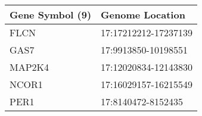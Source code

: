 \begin{tabular}{ll}
\toprule
Gene Symbol (9) &      Genome Location \\
\midrule
           FLCN & 17:17212212-17237139 \\
           GAS7 &  17:9913850-10198551 \\
         MAP2K4 & 17:12020834-12143830 \\
          NCOR1 & 17:16029157-16215549 \\
           PER1 &   17:8140472-8152435 \\
\bottomrule
\end{tabular}
